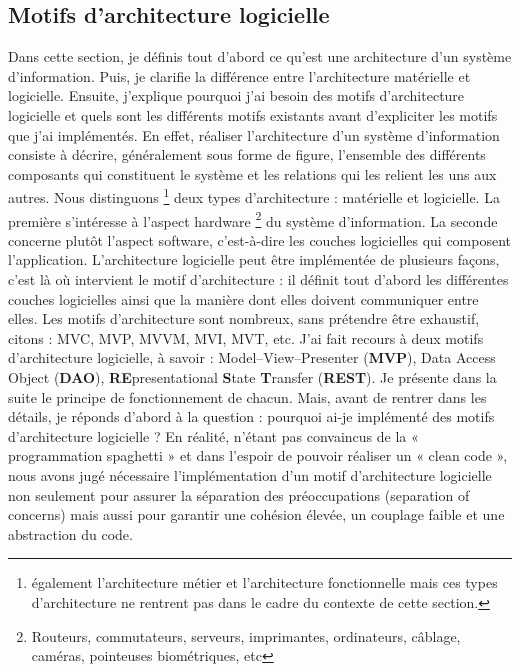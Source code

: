 \subsection{Motifs d’architecture logicielle}
Dans cette section, je définis tout d’abord ce qu’est une architecture d’un système d’information. Puis, je clarifie la différence entre l’architecture matérielle et logicielle. Ensuite, j'explique pourquoi j'ai besoin des motifs d’architecture logicielle et quels sont les différents motifs existants avant d’expliciter les motifs que j'ai implémentés. \newline
En effet, réaliser l’architecture d’un système d’information consiste à décrire, généralement sous forme de figure, l’ensemble des différents composants qui constituent le système et les relations qui les relient les uns aux autres. Nous distinguons \footnote{également l’architecture métier et l’architecture fonctionnelle mais ces types d’architecture ne rentrent pas dans le cadre du contexte de cette section.} deux types d’architecture : matérielle et logicielle. La première s’intéresse à l’aspect hardware \footnote{Routeurs, commutateurs, serveurs, imprimantes, ordinateurs, câblage, caméras, pointeuses biométriques, etc} du système d’information. La seconde concerne plutôt l’aspect software, c’est-à-dire les couches logicielles qui composent l’application. \newline
L’architecture logicielle peut être implémentée de plusieurs façons, c’est là où intervient le motif d’architecture : il définit tout d’abord les différentes couches logicielles ainsi que la manière dont elles doivent communiquer entre elles. Les motifs d’architecture sont nombreux, sans prétendre être exhaustif, citons : \gls{MVC}, MVP, MVVM, MVI, MVT, etc. J'ai fait recours à deux motifs d’architecture logicielle, à savoir : Model–View–Presenter (\textbf{MVP}), Data Access Object (\textbf{\gls{DAO}}), \textbf{RE}presentational \textbf{S}tate \textbf{T}ransfer (\textbf{REST}).
Je présente dans la suite le principe de fonctionnement de chacun. Mais, avant de rentrer dans les détails, je réponds d’abord à la question : pourquoi ai-je implémenté des motifs d’architecture logicielle ? \newline
En réalité, n’étant pas convaincus de la « programmation spaghetti » et dans l’espoir de pouvoir réaliser un « clean code », nous avons jugé nécessaire l’implémentation d’un motif d’architecture logicielle non seulement pour assurer la séparation des préoccupations (separation of concerns) mais aussi pour garantir une cohésion élevée, un couplage faible et une abstraction du code.


